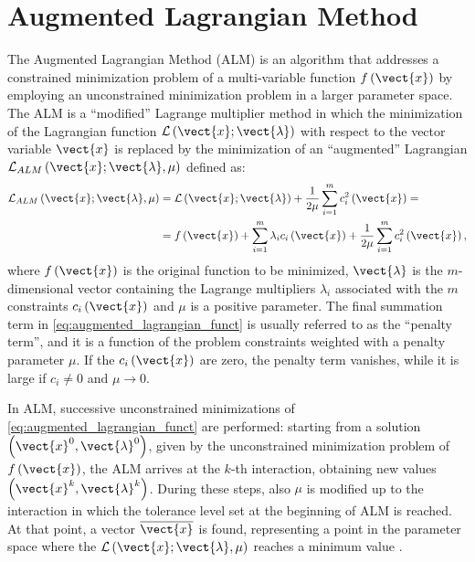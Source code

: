 \chapter{Augmented Lagrangian Method}\label{ch:alm_squared_min}
The Augmented Lagrangian Method (ALM) is an algorithm that addresses a constrained minimization problem of a multi-variable function $f\left(\vect{x}\right)$ by employing an unconstrained minimization problem in a larger parameter space. The ALM is a ``modified'' Lagrange multiplier method in which the minimization of the Lagrangian function $\mathcal{L}\left(\vect{x};\vect{\lambda}\right)$ with respect to the vector variable $\vect{x}$ is replaced by the minimization of an ``augmented'' Lagrangian $\mathcal{L}_{ALM}\left(\vect{x};\vect{\lambda},\mu\right)$ defined as:
\begin{equation}
	\begin{aligned} 
		\mathcal{L}_{ALM}\left(\vect{x};\vect{\lambda},\mu\right)&=\mathcal{L}\left(\vect{x};\vect{\lambda}\right)+\frac{1}{2\mu}\sum_{i=1}^{m}c_i^2\left(\vect{x}\right)=\\ 
		&=f\left(\vect{x}\right)+\sum_{i=1}^{m}\lambda_ic_i\left(\vect{x}\right)+\frac{1}{2\mu}\sum_{i=1}^{m}c_i^2\left(\vect{x}\right),
	\end{aligned}
	\label{eq:augmented_lagrangian_funct}
\end{equation}
where $f\left(\vect{x}\right)$ is the original function to be minimized, $\vect{\lambda}$ is the $m$-dimensional vector containing the Lagrange multipliers $\lambda_i$ associated with the $m$ constraints $c_i\left(\vect{x}\right)$ and $\mu$ is a positive parameter. The final summation term in \autoref{eq:augmented_lagrangian_funct} is usually referred to as the ``penalty term'', and it is a function of the problem constraints weighted with a penalty parameter $\mu$. If the $c_i\left(\vect{x}\right)$ are zero, the penalty term vanishes, while it is large if $c_i\ne0$ and $\mu\rightarrow0$.

In ALM, successive unconstrained minimizations of \autoref{eq:augmented_lagrangian_funct} are performed: starting from a solution $\left(\vect{x}^0,\vect{\lambda}^0\right)$, given by the unconstrained minimization problem of $f\left(\vect{x}\right)$, the ALM arrives at the $k$-th interaction, obtaining new values $\left(\vect{x}^k,\vect{\lambda}^k\right)$. During these steps, also $\mu$ is modified up to the interaction in which the tolerance level set at the beginning of ALM is reached. At that point, a vector $\overline{\vect{x}}$ is found, representing a point in the parameter space where the $\mathcal{L}\left(\vect{x};\vect{\lambda},\mu\right)$ reaches a minimum value \cite{Cho_2016}.

